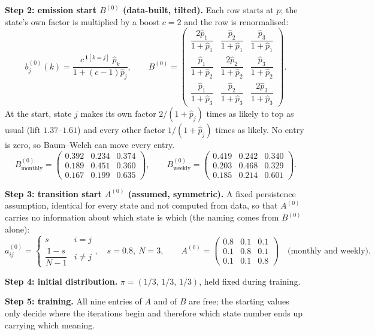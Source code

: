 \documentclass[11pt]{article}
\begin{document}
\textbf{Step 2: emission start $B^{(0)}$ (data-built, tilted).} Each row starts at $\hat p$; the state's own factor is multiplied by a boost $c=2$ and the row is renormalised:
\[
b^{(0)}_j(k)=\frac{c^{\,\mathbf{1}[k=j]}\;\hat p_k}{1+(c-1)\hat p_j},
\qquad
B^{(0)}=
\begin{pmatrix}
\dfrac{2\hat p_1}{1+\hat p_1} & \dfrac{\hat p_2}{1+\hat p_1} & \dfrac{\hat p_3}{1+\hat p_1}\\[10pt]
\dfrac{\hat p_1}{1+\hat p_2} & \dfrac{2\hat p_2}{1+\hat p_2} & \dfrac{\hat p_3}{1+\hat p_2}\\[10pt]
\dfrac{\hat p_1}{1+\hat p_3} & \dfrac{\hat p_2}{1+\hat p_3} & \dfrac{2\hat p_3}{1+\hat p_3}
\end{pmatrix}.
\]
At the start, state $j$ makes its own factor $2/(1+\hat p_j)$ times as likely to top as usual (lift $1.37$--$1.61$) and every other factor $1/(1+\hat p_j)$ times as likely. No entry is zero, so Baum--Welch can move every entry.
\[
B^{(0)}_{\text{monthly}}=
\begin{pmatrix}
0.392 & 0.234 & 0.374\\
0.189 & 0.451 & 0.360\\
0.167 & 0.199 & 0.635
\end{pmatrix},
\qquad
B^{(0)}_{\text{weekly}}=
\begin{pmatrix}
0.419 & 0.242 & 0.340\\
0.203 & 0.468 & 0.329\\
0.185 & 0.214 & 0.601
\end{pmatrix}.
\]

\textbf{Step 3: transition start $A^{(0)}$ (assumed, symmetric).} A fixed persistence assumption, identical for every state and not computed from data, so that $A^{(0)}$ carries no information about which state is which (the naming comes from $B^{(0)}$ alone):
\[
a^{(0)}_{ij}=\begin{cases}s & i=j\\ \dfrac{1-s}{N-1} & i\ne j\end{cases},\quad s=0.8,\ N=3,
\qquad
A^{(0)}=
\begin{pmatrix}
0.8 & 0.1 & 0.1\\
0.1 & 0.8 & 0.1\\
0.1 & 0.1 & 0.8
\end{pmatrix}
\quad\text{(monthly and weekly).}
\]

\textbf{Step 4: initial distribution.} $\pi=(1/3,\,1/3,\,1/3)$, held fixed during training.

\textbf{Step 5: training.} All nine entries of $A$ and of $B$ are free; the starting values only decide where the iterations begin and therefore which state number ends up carrying which meaning.
\end{document}
